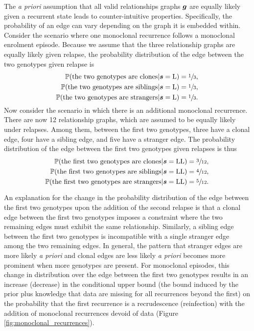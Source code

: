 \documentclass{article}
\begin{document}
The \textit{a priori} assumption that all valid relationships graphs $\bm{g}$ are equally likely given a recurrent state leads to counter-intuitive properties. Specifically, the probability of an edge can vary depending on the graph it is embedded within. Consider the scenario where one monoclonal recurrence follows a monoclonal enrolment episode. 
Because we assume that the three relationship graphs are equally likely given relapse, the probability distribution of the edge between the two genotypes given relapse is
\begin{align}
    \mathbb{P}(\text{the two genotypes are clones}\vert\bm{s}=\mathrm{L}) &= \sfrac{1}{3},
    \label{eq: 1st two C gvn L}\\
    \mathbb{P}(\text{the two genotypes are siblings}\vert\bm{s}=\mathrm{L}) &= \sfrac{1}{3},\\
    \mathbb{P}(\text{the two genotypes are strangers}\vert\bm{s}=\mathrm{L}) &= \sfrac{1}{3}. 
\end{align}
Now consider the scenario in which there is an additional monoclonal recurrence. 
There are now 12 relationship graphs, which are assumed to be equally likely under relapses. Among them, between the first two genotypes, three have a clonal edge, four have a sibling edge, and five have a stranger edge. The probability distribution of the edge between the first two genotypes given relapses is thus
\begin{align}
    \mathbb{P}(\text{the first two genotypes are clones}\vert\bm{s}=\mathrm{L}\mathrm{L}) &= \sfrac{3}{12},
    \label{eq: 1st two C gvn LL}\\
    \mathbb{P}(\text{the first two genotypes are siblings}\vert\bm{s}=\mathrm{L}\mathrm{L}) &= \sfrac{4}{12},\\
    \mathbb{P}(\text{the first two genotypes are strangers}\vert\bm{s}=\mathrm{L}\mathrm{L}) &= \sfrac{5}{12}.
\end{align}

An explanation for the change in the probability distribution of the edge between the first two genotypes upon the addition of the second relapse is that a clonal edge between the first two genotypes imposes a constraint where the two remaining edges must exhibit the same relationship. Similarly, a sibling edge between the first two genotypes is incompatible with a single stranger edge among the two remaining edges. In general, the pattern that stranger edges are more likely \textit{a priori} and clonal edges are less likely \textit{a priori} becomes more prominent when more genotypes are present. For monoclonal episodes, this change in distribution over the edge between the first two genotypes results in an increase (decrease) in the conditional upper bound (the bound induced by the prior plus knowledge that data are missing for all recurrences beyond the first) on the probability that the first recurrence is a recrudescence (reinfection) with the addition of monoclonal recurrences devoid of data (Figure \ref{fig:monoclonal_recurrences}). 
\end{document}
